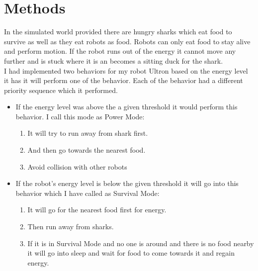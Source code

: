 \documentclass[12pt]{article}
\begin{document}
\section{Methods}
In the simulated world provided there are hungry sharks which eat food to survive as well as they eat robots as food. Robots can only eat food to stay alive and perform motion. If the robot runs out of the energy it cannot move any further and is stuck where it is an becomes a sitting duck for the shark.\\
I had implemented two behaviors for my robot Ultron based on the energy level it has it will perform one of the behavior. Each of the behavior had a different priority sequence which it performed.\\
\begin{itemize}
	\item If the energy level was above the a given threshold it would perform this behavior. I call this mode as Power Mode:
	\begin{enumerate}
		\item It will try to run away from shark first.
		\item And then go towards the nearest food.
		\item Avoid collision with other robots
	\end{enumerate}
	\item If the robot's energy level is below the given threshold it will go into this behavior which I have called as Survival Mode:
	\begin{enumerate}
		\item It will go for the nearest food first for energy.
		\item Then run away from sharks.
		\item If it is in Survival Mode and no one is around and there is no food nearby it will go into sleep and wait for food to come towards it and regain energy.
	\end{enumerate}
\end{itemize}
\end{document}
